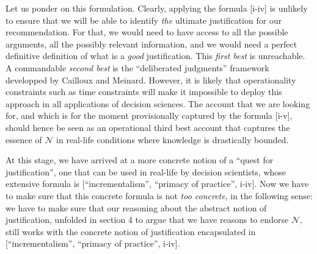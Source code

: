 \documentclass[preprint, french, english, 11pt, authoryear]{elsarticle}%
\newcommand{\adv}{\mathscr{N}}
\begin{document}
Let us ponder on this formulation. Clearly, applying the formula [i-iv] is unlikely to ensure that we will be able to identify \emph{the} ultimate justification for our recommendation. For that, we would need to have access to all the possible arguments, all the possibly relevant information, and we would need a perfect definitive definition of what is a \emph{good} justification. This \emph{first best} is unreachable. A commandable \emph{second best} is the ``deliberated judgments'' framework developped by Cailloux and Meinard. However, it is likely that operationality constraints such as time constraints will make it impossible to deploy this approach in all applications of decision sciences. The account that we are looking for, and which is for the moment provisionally captured by the formula [i-v], should hence be seen as an operational third best account that captures the essence of $\adv$ in real-life conditions where knowledge is drastically bounded.

At this stage, we have arrived at a more concrete notion of a ``quest for justification'', one that can be used in real-life by decision scientists, whose extensive formula is [``incrementalism'', ``primacy of practice'', i-iv]. Now we have to make sure that this concrete formula is not \emph{too concrete}, in the following sense: we have to make sure that our reasoning about the abstract notion of justification, unfolded in section 4 to argue that we have reasons to endorse $\adv$, still works with the concrete notion of justification encapsulated in [``incrementalism'', ``primacy of practice'', i-iv].
\end{document}
